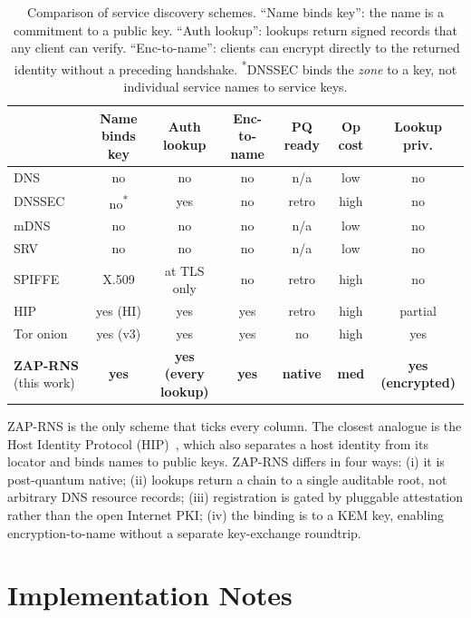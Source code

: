 \documentclass[11pt,a4paper]{article}
\theoremstyle{definition}
\theoremstyle{remark}
\newcommand{\RNS}{\textsc{ZAP-RNS}}
\begin{document}
\begin{table}[h]
\centering
\small
\begin{tabular}{lcccccc}
\toprule
& \textbf{Name binds key} & \textbf{Auth lookup} & \textbf{Enc-to-name} & \textbf{PQ ready} & \textbf{Op cost} & \textbf{Lookup priv.} \\
\midrule
DNS~\cite{rfc1035}      & no    & no    & no    & n/a & low    & no \\
DNSSEC~\cite{rfc4033}   & no\textsuperscript{*} & yes & no & retro & high & no \\
mDNS~\cite{rfc6762}     & no    & no    & no    & n/a & low    & no \\
SRV~\cite{rfc2782}      & no    & no    & no    & n/a & low    & no \\
SPIFFE~\cite{spiffe}    & X.509 & at TLS only & no & retro & high & no \\
HIP~\cite{rfc7401}      & yes (HI) & yes & yes & retro & high & partial \\
Tor onion~\cite{tor}    & yes (v3) & yes & yes & no & high & yes \\
\textbf{\RNS} (this work) & \textbf{yes} & \textbf{yes (every lookup)} & \textbf{yes} & \textbf{native} & \textbf{med} & \textbf{yes (encrypted)} \\
\bottomrule
\end{tabular}
\caption{Comparison of service discovery schemes. ``Name binds key'':
the name is a commitment to a public key. ``Auth lookup'': lookups
return signed records that any client can verify. ``Enc-to-name'':
clients can encrypt directly to the returned identity without a
preceding handshake. \textsuperscript{*}DNSSEC binds the \emph{zone}
to a key, not individual service names to service keys.}
\label{tab:cmp}
\end{table}

\RNS{} is the only scheme that ticks every column. The closest
analogue is the Host Identity Protocol (HIP)~\cite{rfc7401}, which
also separates a host identity from its locator and binds names to
public keys. \RNS{} differs in four ways: (i) it is post-quantum native;
(ii) lookups return a chain to a single auditable root, not arbitrary
DNS resource records; (iii) registration is gated by pluggable
attestation rather than the open Internet PKI; (iv) the binding is to
a KEM key, enabling encryption-to-name without a separate key-exchange
roundtrip.

\section{Implementation Notes}\label{sec:impl}
\end{document}
